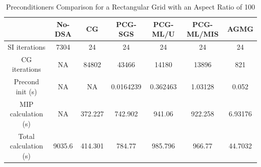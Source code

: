\documentclass[preprint,10pt]{elsarticle}
\renewcommand{\(}{\left(}
\renewcommand{\)}{\right)}
\renewcommand{\[}{\left[}
\renewcommand{\]}{\right]}
\begin{document}
\begin{table}[!htbp]
  \caption{Preconditioners Comparison for a Rectangular Grid with an Aspect Ratio of 100}
  \begin{center}
    \begin{tabular}{|c|c|c|c|c|c|c|}
      \hline
       & No-DSA & CG & PCG-SGS & PCG-ML/U & PCG-ML/MIS & AGMG \\
      \hline
      SI iterations & 7304    & 24      & 24        & 24       & 24      & 24 \\
      CG iterations & NA      & 84802   & 43466     & 14180    & 13896   & 821 \\
\hline
   Precond init (s) & NA      & NA      & 0.0164239 & 0.362463 & 1.03128 & 0.052 \\
MIP calculation (s) & NA      & 372.227 & 742.902   & 941.06   & 922.258 &6.93176 \\
Total calculation (s) & 9035.6 & 414.301 & 784.77   & 985.796  & 966.77  &44.7032 \\
      \hline
    \end{tabular}
    \label{table_ar_100}
  \end{center}
\end{table}                  
\end{document}
